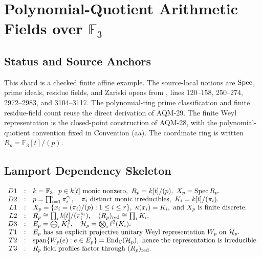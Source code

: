 
\section{Polynomial-Quotient Arithmetic Fields over \texorpdfstring{\(\mathbb F_3\)}{F3}}
\label{sec:f3-polynomial-quotient-arithmetic-fields}

\subsection{Status and Source Anchors}

This shard is a checked finite affine example.  The source-local notions are
\(\operatorname{Spec}\), prime ideals, residue fields, and Zariski opens from
, lines
120--158, 250--274, 2972--2983, and 3104--3117.  The polynomial-ring prime
classification and finite residue-field count reuse the direct derivation of
AQM-29.  The finite Weyl representation is the closed-point construction of
AQM-28, with the polynomial-quotient convention fixed in Convention (aa).
The coordinate ring is written \(R_p=\mathbb F_3[t]/(p)\).

\subsection{Lamport Dependency Skeleton}

\[
\begin{array}{rcl}
D1&:&k=\mathbb F_3,\ p\in k[t]\text{ monic nonzero},\
      R_p=k[t]/(p),\ X_p=\operatorname{Spec} R_p.\\
D2&:&p=\prod_{i=1}^r\pi_i^{e_i},\quad
      \pi_i\text{ distinct monic irreducibles},\
      K_i=k[t]/(\pi_i).\\
L1&:&X_p=\{x_i=(\pi_i)/(p):1\le i\le r\},\
      \kappa(x_i)=K_i,\text{ and }X_p\text{ is finite discrete}.\\
L2&:&R_p\cong\prod_i k[t]/(\pi_i^{e_i}),\quad
      (R_p)_{\rm red}\cong\prod_i K_i.\\
D3&:&E_p=\bigoplus_i K_i^2,\quad
      \mathcal H_p=\bigotimes_i\ell^2(K_i).\\
T1&:&E_p\text{ has an explicit projective unitary Weyl representation }
      W_p\text{ on }\mathcal H_p.\\
T2&:&\operatorname{span}\{W_p(e):e\in E_p\}
      =\operatorname{End}_{\mathbb C}(\mathcal H_p),\text{ hence the
      representation is irreducible.}\\
T3&:&R_p\text{ field profiles factor through }(R_p)_{\rm red}.\\
\end{array}
\]

